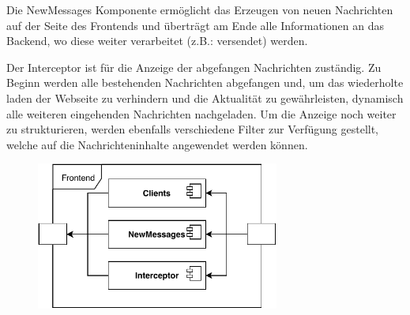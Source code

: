     Die NewMessages Komponente ermöglicht das Erzeugen von neuen Nachrichten auf der Seite des Frontends und überträgt am Ende alle Informationen an das Backend, wo diese weiter verarbeitet (z.B.: versendet) werden.
    
    Der Interceptor ist für die Anzeige der abgefangen Nachrichten zuständig. Zu Beginn werden alle bestehenden Nachrichten abgefangen und, um das wiederholte laden der Webseite zu verhindern und die Aktualität zu gewährleisten, dynamisch alle weiteren eingehenden Nachrichten nachgeladen. Um die Anzeige noch weiter zu strukturieren, werden ebenfalls verschiedene Filter zur Verfügung gestellt, welche auf die Nachrichteninhalte angewendet werden können.
    \begin{figure}[h]%
        \centering
        \includegraphics[width=8cm]{tex/bilder/4_konzept/Systemdiagramm_Konzept_Frontend.pdf}
        \label{fig:system_frontend}
    \end{figure}

